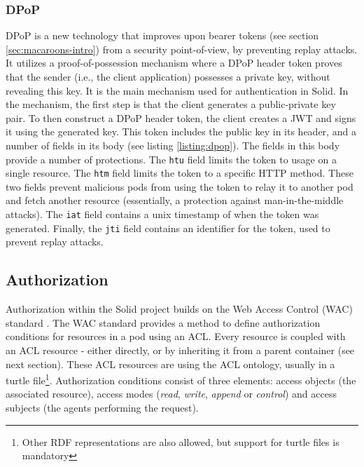 \subsubsection{DPoP}
\label{sec:dpop}
\acrfull{DPoP} \citep{ietf-oauth-dpop} is a new technology that improves upon bearer tokens (see section \ref{sec:macaroons-intro}) from a security point-of-view, by preventing replay attacks. It utilizes a proof-of-possession mechanism where a \gls{DPoP} header token proves that the sender (i.e., the client application) possesses a private key, without revealing this key. It is the main mechanism used for authentication in Solid. In the mechanism, the first step is that the client generates a public-private key pair. To then construct a \gls{DPoP} header token, the client creates a \gls{JWT} and signs it using the generated key. This token includes the public key in its header, and a number of fields in its body (see listing \ref{listing:dpop}).
{}
\noindent The fields in this body provide a number of protections. The \texttt{htu} field limits the token to usage on a single resource. The \texttt{htm} field limits the token to a specific HTTP method. These two fields prevent malicious pods from using the token to relay it to another pod and fetch another resource (essentially, a protection against man-in-the-middle attacks). The \texttt{iat} field contains a unix timestamp of when the token was generated. Finally, the \texttt{jti} field contains an identifier for the token, used to prevent replay attacks.

\newpage
\subsection{Authorization}
\label{sec:solid-authorization}
Authorization within the Solid project builds on the Web Access Control (WAC) standard \citep{wac}. The WAC standard provides a method to define authorization conditions for resources in a pod using an \gls{ACL}. Every resource is coupled with an \gls{ACL} resource - either directly, or by inheriting it from a parent container (see next section). These \gls{ACL} resources are using the \gls{ACL} ontology, usually in a turtle file\footnote{Other \gls{RDF} representations are also allowed, but support for turtle files is mandatory}. Authorization conditions consist of three elements: access objects (the associated resource), access modes (\textit{read}, \textit{write}, \textit{append} or \textit{control}) and access subjects (the agents performing the request).


